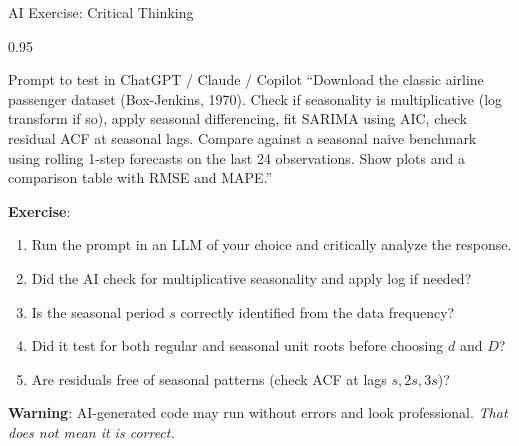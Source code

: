 \documentclass[9pt, aspectratio=169, t]{beamer}
\begin{document}
\begin{frame}{AI Exercise: Critical Thinking}
    \begin{cminipage}{0.95\textwidth}
    \vspace{-0.3cm}
    \begin{block}{\footnotesize Prompt to test in ChatGPT / Claude / Copilot}
        {\footnotesize
        ``Download the classic airline passenger dataset (Box-Jenkins, 1970). Check if seasonality is multiplicative (log transform if so), apply seasonal differencing, fit SARIMA using AIC, check residual ACF at seasonal lags. Compare against a seasonal naive benchmark using rolling 1-step forecasts on the last 24 observations. Show plots and a comparison table with RMSE and MAPE.''
        }
    \end{block}
    \vspace{-2mm}
    {\footnotesize
    \textbf{Exercise}:
    \begin{enumerate}\setlength{\itemsep}{0pt}
        \item Run the prompt in an LLM of your choice and critically analyze the response.
        \item Did the AI check for multiplicative seasonality and apply log if needed?
        \item Is the seasonal period $s$ correctly identified from the data frequency?
        \item Did it test for both regular and seasonal unit roots before choosing $d$ and $D$?
        \item Are residuals free of seasonal patterns (check ACF at lags $s, 2s, 3s$)?
    \end{enumerate}
    }
    \vspace{-2mm}
    \begin{alertblock}{}
        {\footnotesize \textbf{Warning}: AI-generated code may run without errors and look professional. \textit{That does not mean it is correct.}}
    \end{alertblock}
    \end{cminipage}
\end{frame}
\end{document}
